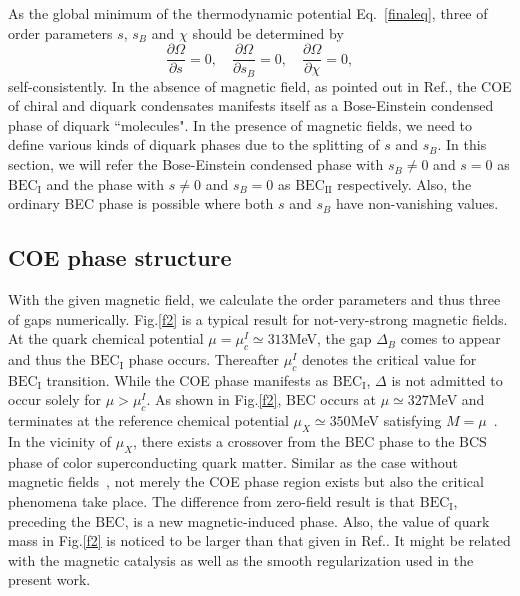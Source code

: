 \documentclass[prd, showpacs,nofootinbib,amsmath,amssymb,12pt]{revtex4}
\begin{document}
As the global minimum of the thermodynamic potential Eq.~\eqref{finaleq}, three of order parameters $s$, $s_B$ and $\chi$ should be determined by
\begin{equation}
\frac{\partial\Omega}{\partial s} =0,\quad 
\frac{\partial\Omega}{\partial s_B} =0,\quad 
\frac{\partial\Omega}{\partial \chi} =0,
\end{equation}
self-consistently. In the absence of magnetic field, as pointed out in Ref.\cite{abuki2010nambu},
the COE of chiral and diquark condensates manifests itself as a Bose-Einstein condensed phase of diquark ``molecules". 
In the presence of magnetic fields, we need to define various kinds of diquark phases due to the splitting of $s$ and $s_B$.
In this section, we will refer the Bose-Einstein condensed phase with $s_B\neq 0$ and $s=0$ as $\text{BEC}_\text{I}$ and the phase with $s\neq 0$ and $s_B = 0$ as $\text{BEC}_\text{II}$ respectively. Also, the ordinary BEC phase is possible where both $s$ and $s_B$ have non-vanishing values. 

\subsection{COE phase structure}
\label{sec:3a}

With the given magnetic field, we calculate the order parameters and thus three of gaps numerically. Fig.\ref{f2} is a typical result for not-very-strong magnetic fields.
At the quark chemical potential $\mu= \mu_c^I \simeq313$MeV, the gap $\Delta_B$ comes to appear and thus the $\text{BEC}_\text{I}$ phase occurs. Thereafter $\mu_c^I$ denotes the critical value for $\text{BEC}_\text{I}$ transition. 
While the COE phase manifests as $\text{BEC}_\text{I}$, $\Delta$ is not admitted to occur solely for $\mu>\mu_c^I $. As shown in Fig.\ref{f2}, $\text{BEC}$ occurs at $\mu \simeq327$MeV and terminates at the reference chemical potential $\mu_X \simeq350$MeV satisfying $M=\mu$~\cite{kitazawa2008bound}. In the vicinity of $\mu_X$, there exists a crossover from the $\text{BEC}$ phase to the $\text{BCS}$ phase of color superconducting quark matter.  
Similar as the case without magnetic fields~\cite{abuki2010nambu}, 
not merely the COE phase region exists but also the critical phenomena take place.
The difference from zero-field result is that $\text{BEC}_\text{I}$, preceding the $\text{BEC}$, is a new magnetic-induced phase.
Also, the value of quark mass in Fig.\ref{f2} is noticed to be larger than that given in Ref.\cite{abuki2010nambu}. It might be related with the magnetic catalysis as well as the smooth regularization used in the present work. 
\end{document}
